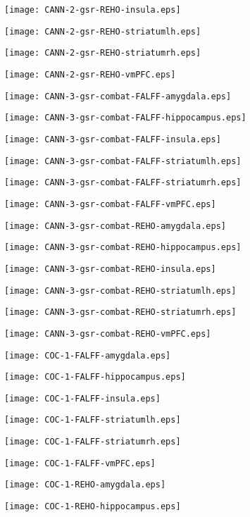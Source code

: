 \documentclass{article}
\begin{document}

\newpage
\texttt{[image: CANN-2-gsr-REHO-insula.eps]}

\newpage
\texttt{[image: CANN-2-gsr-REHO-striatumlh.eps]}

\newpage
\texttt{[image: CANN-2-gsr-REHO-striatumrh.eps]}

\newpage
\texttt{[image: CANN-2-gsr-REHO-vmPFC.eps]}

\newpage
\texttt{[image: CANN-3-gsr-combat-FALFF-amygdala.eps]}

\newpage
\texttt{[image: CANN-3-gsr-combat-FALFF-hippocampus.eps]}

\newpage
\texttt{[image: CANN-3-gsr-combat-FALFF-insula.eps]}

\newpage
\texttt{[image: CANN-3-gsr-combat-FALFF-striatumlh.eps]}

\newpage
\texttt{[image: CANN-3-gsr-combat-FALFF-striatumrh.eps]}

\newpage
\texttt{[image: CANN-3-gsr-combat-FALFF-vmPFC.eps]}

\newpage
\texttt{[image: CANN-3-gsr-combat-REHO-amygdala.eps]}

\newpage
\texttt{[image: CANN-3-gsr-combat-REHO-hippocampus.eps]}

\newpage
\texttt{[image: CANN-3-gsr-combat-REHO-insula.eps]}

\newpage
\texttt{[image: CANN-3-gsr-combat-REHO-striatumlh.eps]}

\newpage
\texttt{[image: CANN-3-gsr-combat-REHO-striatumrh.eps]}

\newpage
\texttt{[image: CANN-3-gsr-combat-REHO-vmPFC.eps]}

\newpage
\texttt{[image: COC-1-FALFF-amygdala.eps]}

\newpage
\texttt{[image: COC-1-FALFF-hippocampus.eps]}

\newpage
\texttt{[image: COC-1-FALFF-insula.eps]}

\newpage
\texttt{[image: COC-1-FALFF-striatumlh.eps]}

\newpage
\texttt{[image: COC-1-FALFF-striatumrh.eps]}

\newpage
\texttt{[image: COC-1-FALFF-vmPFC.eps]}

\newpage
\texttt{[image: COC-1-REHO-amygdala.eps]}

\newpage
\texttt{[image: COC-1-REHO-hippocampus.eps]}
\end{document}
